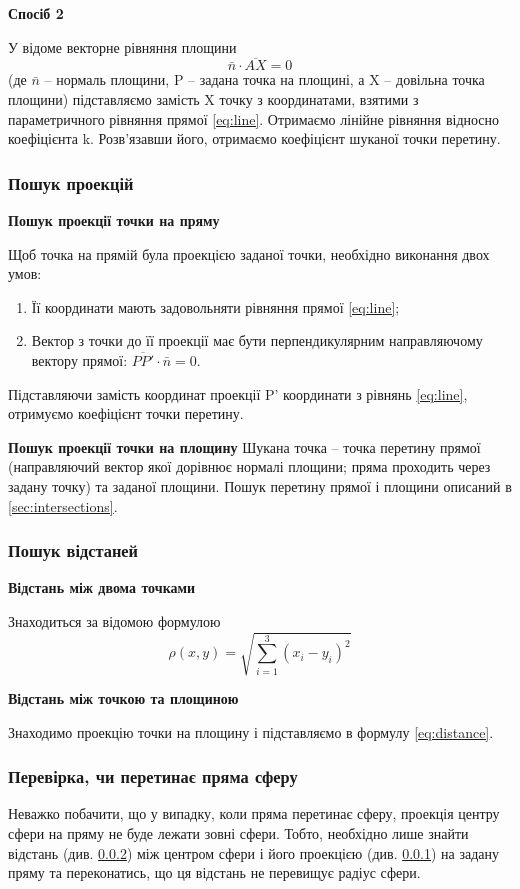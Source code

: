 \documentclass[a4paper,12pt]{article}
\begin{document}
\textbf{Спосіб 2}

У відоме векторне рівняння площини
\begin{equation} \label{eq:plane-vector}
  \bar n \cdot \overline{AX} = 0
\end{equation}
(де $\bar n$ -- нормаль площини, P -- задана точка на площині, а X -- довільна точка площини) підставляємо замість X точку з координатами, взятими з параметричного рівняння прямої \ref{eq:line}. Отримаємо лінійне рівняння відносно коефіцієнта k. Розв’язавши його, отримаємо коефіцієнт шуканої точки перетину.

\subsubsection{Пошук проекцій} \label{sec:projections}
\textbf{Пошук проекції точки на пряму}

Щоб точка на прямій була проекцією заданої точки, необхідно виконання двох умов:
\begin{enumerate}
  \item Її координати мають задовольняти рівняння прямої \ref{eq:line};
  \item Вектор з точки до її проекції має бути перпендикулярним направляючому вектору прямої: $\overline{PP'} \cdot \bar n = 0$.
\end{enumerate}
Підставляючи замість координат проекції P' координати з рівнянь \ref{eq:line}, отримуємо коефіцієнт точки перетину.

\textbf{Пошук проекції точки на площину}
Шукана точка -- точка перетину прямої (направляючий вектор якої дорівнює нормалі площини; пряма проходить через задану точку) та заданої площини. Пошук перетину прямої і площини описаний в \ref{sec:intersections}.

\subsubsection{Пошук відстаней} \label{sec:distance}
\textbf{Відстань між двома точками}

Знаходиться за відомою формулою
\begin{equation} \label{eq:distance}
  \rho(x,y) = \sqrt{\sum \limits_{i=1}^3 (x_i - y_i)^2}
\end{equation}

\textbf{Відстань між точкою та площиною}

Знаходимо проекцію точки на площину і підставляємо в формулу \ref{eq:distance}.

\subsubsection{Перевірка, чи перетинає пряма сферу}
Неважко побачити, що у випадку, коли пряма перетинає сферу, проекція центру сфери на пряму не буде лежати зовні сфери. Тобто, необхідно лише знайти відстань (див. \ref{sec:distance}) між центром сфери і його проекцією (див. \ref{sec:projections}) на задану пряму та переконатись, що ця відстань не перевищує радіус сфери.
\end{document}
